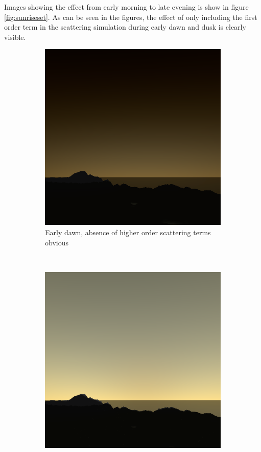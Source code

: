 \documentclass{article}
\begin{document}
Images showing the effect from early morning to late evening is show in figure \ref{fig:sunriseset}. As can be seen in the figures, the effect of only including the first order term in the scattering simulation during early dawn and dusk is clearly visible.

\begin{figure}[H]
\centering
    \begin{subfigure}[b]{0.45\textwidth}
        \centering
        \includegraphics[scale=0.25]{light2}
        \caption{Early dawn, absence of higher order scattering terms obvious}
        \label{fig:light2}
    \end{subfigure}
    ~
    \begin{subfigure}[b]{0.45\textwidth}
        \centering
        \includegraphics[scale=0.25]{light5}

\end{subfigure}
\end{figure}
\end{document}
